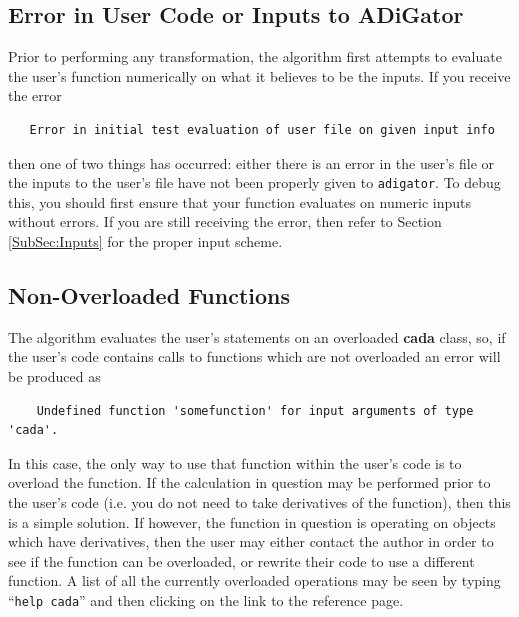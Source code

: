 \documentclass[10pt,pdftex]{article}
\begin{document}
\subsection{Error in User Code or Inputs to ADiGator}
Prior to performing any transformation, the algorithm first attempts to evaluate the user's function numerically on what it believes to be the inputs.
If you receive the error
\begin{verbatim}
   Error in initial test evaluation of user file on given input info
\end{verbatim}
then one of two things has occurred: either there is an error in the user's file or the inputs to the user's file have not been properly given to \texttt{adigator}. To debug this, you should first ensure that your function evaluates on numeric inputs without errors. If you are still receiving the error, then refer to Section \ref{SubSec:Inputs} for the proper input scheme.
\subsection{Non-Overloaded Functions}
The algorithm evaluates the user's statements on an overloaded {\bf cada} class, so, if the user's code contains calls to functions which are not overloaded an error will be produced as
\begin{verbatim}
    Undefined function 'somefunction' for input arguments of type 'cada'.
\end{verbatim}
In this case, the only way to use that function within the user's code is to overload the function. If the calculation in question may be performed prior to the user's code (i.e. you do not need to take derivatives of the function), then this is a simple solution. If however, the function in question is operating on objects which have derivatives, then the user may either contact the author in order to see if the function can be overloaded, or rewrite their code to use a different function. A list of all the currently overloaded operations may be seen by typing ``\texttt{help cada}'' and then clicking on the link to the reference page.
\end{document}
